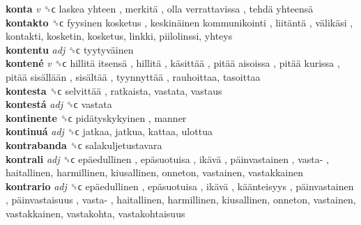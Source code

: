 \textbf{konta} \emph{v}  ␝ϲ   laskea yhteen ,  merkitä ,  olla verrattavissa ,  tehdä yhteensä   \\
\textbf{kontakto} ␝ϲ   fyysinen kosketus ,  keskinäinen kommunikointi ,  liitäntä ,  välikäsi , kontakti, kosketin, kosketus, linkki, piilolinssi, yhteys  \\
\textbf{kontentu} \emph{adj}  ␝ϲ   tyytyväinen   \\
\textbf{kontené} \emph{v}  ␝ϲ   hillitä itsensä ,  hillitä ,  käsittää ,  pitää aisoissa ,  pitää kurissa ,  pitää sisällään ,  sisältää ,  tyynnyttää , rauhoittaa, tasoittaa  \\
\textbf{kontesta} ␝ϲ   selvittää , ratkaista, vastata, vastaus  \\
\textbf{kontestá} \emph{adj}  ␝ϲ  vastata  \\
\textbf{kontinente} ␝ϲ   pidätyskykyinen , manner  \\
\textbf{kontinuá} \emph{adj}  ␝ϲ  jatkaa, jatkua, kattaa, ulottua  \\
\textbf{kontrabanda} ␝ϲ  salakuljetustavara  \\
\textbf{kontrali} \emph{adj}  ␝ϲ   epäedullinen ,  epäsuotuisa ,  ikävä ,  päinvastainen ,  vasta- , haitallinen, harmillinen, kiusallinen, onneton, vastainen, vastakkainen  \\
\textbf{kontrario} \emph{adj}  ␝ϲ   epäedullinen ,  epäsuotuisa ,  ikävä ,  käänteisyys ,  päinvastainen ,  päinvastaisuus ,  vasta- , haitallinen, harmillinen, kiusallinen, onneton, vastainen, vastakkainen, vastakohta, vastakohtaisuus  \\
